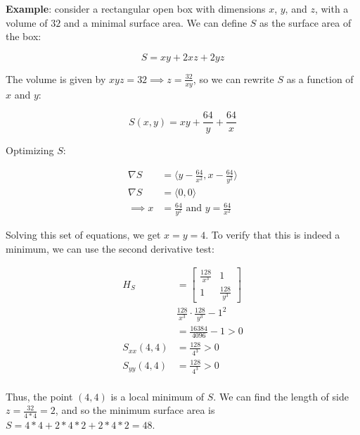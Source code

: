 \documentclass[12pt]{article}
\begin{document}
{%

\textbf{Example}: consider a rectangular open box with dimensions $x$, $y$, and $z$, with a volume of $32$ and a minimal surface area. We can define $S$ as the surface area of the box:

\begin{equation*}
    S = xy + 2xz + 2yz
\end{equation*}

The volume is given by $xyz = 32 \implies z = \frac{32}{xy}$, so we can rewrite $S$ as a function of $x$ and $y$:

\begin{equation*}
    S(x,y) = xy + \frac{64}{y} + \frac{64}{x}
\end{equation*}

Optimizing $S$:

\begin{align*}
    \nabla S &= \langle y - \frac{64}{x^2}, x - \frac{64}{y^2}\rangle\\
    \nabla S &= \langle 0, 0\rangle\\
    \implies x &= \frac{64}{y^2} \text{ and } y = \frac{64}{x^2}
\end{align*}

Solving this set of equations, we get $x = y = 4$. To verify that this is indeed a minimum, we can use the second derivative test:

\begin{align*}
    H_S &= \begin{bmatrix}
        \frac{128}{x^3} & 1\\
        1 & \frac{128}{y^3}
    \end{bmatrix}\\
    &\frac{128}{x^3} \cdot \frac{128}{y^3} - 1^2\\
    &= \frac{16384}{4096}-1 > 0\\
    S_{xx}(4,4) &= \frac{128}{4^3} > 0\\
    S_{yy}(4,4) &= \frac{128}{4^3} > 0\\
\end{align*}

Thus, the point $(4,4)$ is a local minimum of $S$. We can find the length of side $z = \frac{32}{4*4} = 2$, and so the minimum surface area is $S = 4*4 + 2*4*2 + 2*4*2 = 48$.
}
\end{document}
